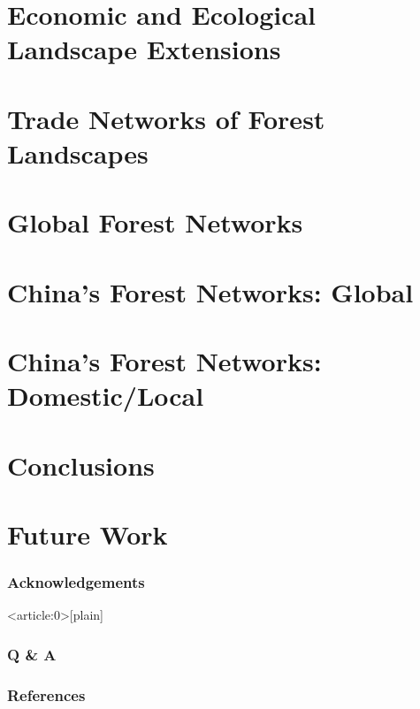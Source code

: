 \documentclass[aspectratio=169]{beamer}
\begin{document}
\section{Economic and Ecological Landscape Extensions}



\section{Trade Networks of Forest Landscapes}

\section{Global Forest Networks}


\section{China's Forest Networks: Global}


\section{China's Forest Networks: Domestic/Local}


\section{Conclusions}

\section{Future Work}

\begin{frame}
  \frametitle{Acknowledgements}
\end{frame}



{ %
    \begin{frame}<article:0>[plain]
      \frametitle{Q \& A}
     \end{frame}
}

\begin{frame}
  \parencite{Burgess2012}    
  \cite{Caggiani2014}
  \cite{Carvalho2019AdaptationSystems}
  \cite{Schaffer-Smith2018NetworkTrade}
\end{frame}


\begin{frame}[allowframebreaks]
  \frametitle{References}
  \tiny 
  
\end{frame}
\end{document}
